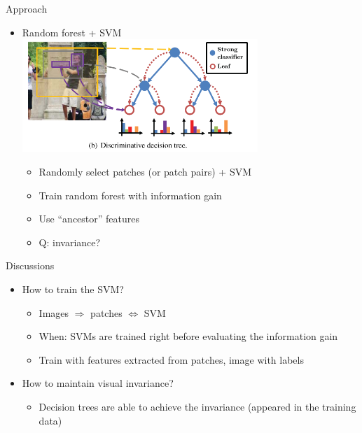 \documentclass[12pt]{beamer}
\begin{document}
\begin{frame}{Approach}
    \begin{itemize}
        \item Random forest + SVM \\
        \medskip
        { \includegraphics[width=0.7\textwidth]{fffig3.png} }
        \begin{itemize}
            \item Randomly select patches (or patch pairs) + SVM
            \item Train random forest with information gain
            \item Use ``ancestor'' features
            \item Q: invariance?
        \end{itemize}
    \end{itemize}
\end{frame}

\begin{frame}{Discussions}
    \begin{itemize}
        \item How to train the SVM?
        \begin{itemize}
            \item Images $\Rightarrow$ patches $\Leftrightarrow$ SVM
            \item When: SVMs are trained right before evaluating the information gain
            \\  
            \item Train with features extracted from patches, image with labels
        \end{itemize}
        \item How to maintain visual invariance?
        \begin{itemize}
            \item Decision trees are able to achieve the invariance (appeared in the training data)
        \end{itemize}
    \end{itemize}
\end{frame}
\end{document}
